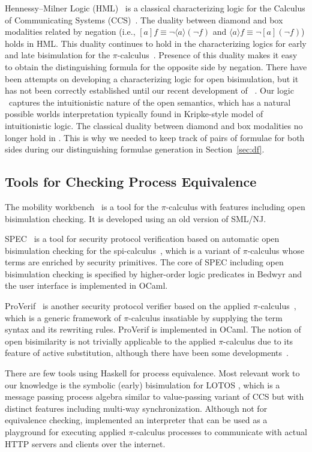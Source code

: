 Hennessy--Milner Logic (HML)~\cite{HenMil80hml} is a classical
characterizing logic for the Calculus of Communicating Systems (CCS)~\cite{Mil82ccs}.
The duality between diamond and box modalities related by negation 
(i.e., $[a]f \equiv \neg\langle a\rangle(\neg f)$ and $\langle a\rangle f \equiv \neg[a](\neg f)$)
holds in HML. This duality continues to hold in the characterizing logics for
early and late bisimulation for the $\pi$-calculus~\cite{MilParWal93lm}.
Presence of this duality makes it easy to obtain the distinguishing formula
for the opposite side by negation.
There have been attempts \cite{TiuMil10,ParBorEriGutWeb15} on developing
a characterizing logic for open bisimulation, but it has not been correctly
established until our recent development of \OM~\cite{AhnHorTiu17corr}.
Our logic \OM\ captures the intuitionistic nature of the open semantics, which
has a natural possible worlds interpretation typically found in Kripke-style model
of intuitionistic logic. The classical duality between diamond and box modalities
no longer hold in \OM. This is why we needed to keep track of pairs of formulae
for both sides %
during our distinguishing formulae generation in Section~\ref{sec:df}.%
\vspace*{-1.5ex}
\subsection{Tools for Checking Process Equivalence}
\label{sec:relwork:tools}
The mobility workbench~\cite{VicMil94mwb} is a tool for the $\pi$-calculus
with features including open bisimulation checking. It is developed using
an old version of SML/NJ.

SPEC~\cite{TiuNamHor16spec} is a tool for security protocol verification based on
automatic open bisimulation checking \cite{TiuDaw10} for the spi-calculus~\cite{Abadi97ccs},
which is a variant of $\pi$-calculus whose terms are enriched by security primitives.
The core of SPEC including open bisimulation checking is specified by
higher-order logic predicates in Bedwyr \cite{Bedwyr07} and the user interface
is implemented in OCaml.

ProVerif~\cite{BlaFou05} is another security protocol verifier based on
the applied $\pi$-calculus~\cite{AbaFou01appi}, which is a generic framework of
$\pi$-calculus insatiable by supplying the term syntax and its
rewriting rules. ProVerif is implemented in OCaml.
The notion of open bisimilarity is not trivially applicable to 
the applied $\pi$-calculus due to its feature of active substitution,
although there have been some developments~\cite{ZhuGuWu08}.

There are few tools using Haskell for process equivalence.
Most relevant work to our knowledge is the symbolic (early) bisimulation for
LOTOS \cite{CalSha01lotos}, which is a message passing process algebra
similar to value-passing variant of CCS but with distinct features
including multi-way synchronization. Although not for equivalence checking,
\citet{Renzy14phi} implemented an interpreter that can be used as
a playground for executing applied $\pi$-calculus processes to
communicate with actual HTTP servers and clients over the internet.

